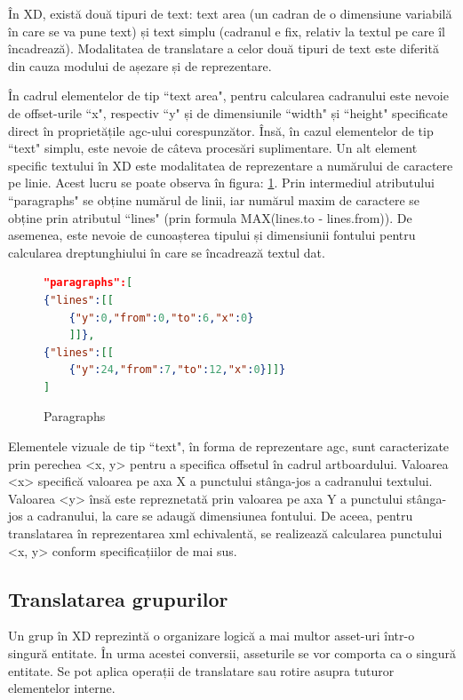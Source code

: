 În XD, există două tipuri de text: text area (un cadran de o dimensiune variabilă în care se va pune text) și text simplu (cadranul e fix, relativ la textul pe care îl încadrează). Modalitatea de translatare a celor două tipuri de text este diferită din cauza modului de așezare și de reprezentare. 

În cadrul elementelor de tip ``text area", pentru calcularea cadranului este nevoie de offset-urile ``x", respectiv ``y" și de dimensiunile ``width" și ``height" specificate direct în proprietățile agc-ului corespunzător. Însă, în cazul elementelor de tip ``text" simplu, este nevoie de câteva procesări suplimentare.
Un alt element specific textului în XD este modalitatea de reprezentare a numărului de caractere pe linie. Acest lucru se poate observa în figura: \ref{fig:Paragraphs}. Prin intermediul atributului ``paragraphs" se obține numărul de linii, iar numărul maxim de caractere se obține prin atributul ``lines" (prin formula  MAX(lines.to - lines.from)). De asemenea, este nevoie de cunoașterea tipului și dimensiunii fontului pentru calcularea dreptunghiului în care se încadrează textul dat.

\begin{figure}[!htbp]
\begin{lstlisting}[language=json,firstnumber=1]
"paragraphs":[
{"lines":[[
    {"y":0,"from":0,"to":6,"x":0}
    ]]},
{"lines":[[
    {"y":24,"from":7,"to":12,"x":0}]]}
]
\end{lstlisting}
\caption{Paragraphs} \label{fig:Paragraphs}
\end{figure}

Elementele vizuale de tip ``text", în forma de reprezentare agc, sunt caracterizate prin perechea <x, y> pentru a specifica offsetul în cadrul artboardului. Valoarea <x> specifică valoarea pe axa X a punctului stânga-jos a cadranului textului. Valoarea <y> însă este repreznetată prin valoarea pe axa Y a punctului stânga-jos a cadranului, la care se adaugă dimensiunea fontului. De aceea, pentru translatarea în reprezentarea xml echivalentă, se realizează calcularea punctului <x, y> conform specificațiilor de mai sus.

\subsection{Translatarea grupurilor}

Un grup în XD reprezintă o organizare logică a mai multor asset-uri într-o singură entitate. În urma acestei conversii, asseturile se vor comporta ca o singură entitate. Se pot aplica operații de translatare sau rotire asupra tuturor elementelor interne. 

